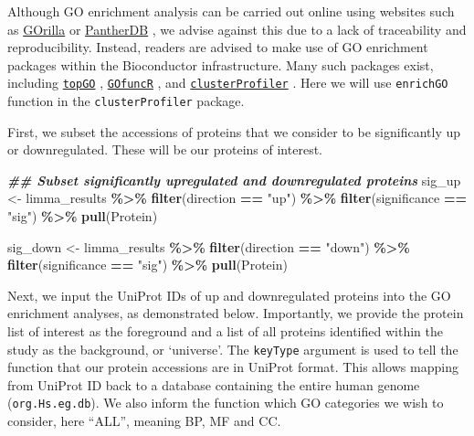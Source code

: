 \documentclass[9pt,a4paper,]{extarticle}
\newenvironment{Shaded}{\begin{snugshade}}{\end{snugshade}}
\newcommand{\DocumentationTok}[1]{\textcolor[rgb]{0.56,0.35,0.01}{\textbf{\textit{#1}}}}
\newcommand{\FunctionTok}[1]{\textcolor[rgb]{0.13,0.29,0.53}{\textbf{#1}}}
\newcommand{\NormalTok}[1]{#1}
\newcommand{\OtherTok}[1]{\textcolor[rgb]{0.56,0.35,0.01}{#1}}
\newcommand{\SpecialCharTok}[1]{\textcolor[rgb]{0.81,0.36,0.00}{\textbf{#1}}}
\newcommand{\StringTok}[1]{\textcolor[rgb]{0.31,0.60,0.02}{#1}}
\begin{document}
Although GO enrichment analysis can be carried out online using websites such
as \href{http://cbl-gorilla.cs.technion.ac.il}{GOrilla} \citep{Eden2009} or
\href{http://www.pantherdb.org}{PantherDB} \citep{Mi2012, Thomas2021}, we advise against
this due to a lack of traceability and reproducibility. Instead, readers are
advised to make use of GO enrichment packages within the Bioconductor
infrastructure. Many such packages exist, including \href{https://bioconductor.org/packages/release/bioc/html/topGO.html}{\texttt{topGO}} \citep{topGO},
\href{https://www.bioconductor.org/packages/release/bioc/html/GOfuncR.html}{\texttt{GOfuncR}} \citep{GofuncR},
and \href{https://bioconductor.org/packages/release/bioc/html/clusterProfiler.html}{\texttt{clusterProfiler}}
\citep{Wu2021}. Here we will use \texttt{enrichGO} function in the \texttt{clusterProfiler} package.

First, we subset the accessions of proteins that we consider to be significantly
up or downregulated. These will be our proteins of interest.

\begin{Shaded}
\begin{Highlighting}[]
\DocumentationTok{\#\# Subset significantly upregulated and downregulated  proteins}
\NormalTok{sig\_up }\OtherTok{\textless{}{-}}\NormalTok{ limma\_results }\SpecialCharTok{\%\textgreater{}\%}
  \FunctionTok{filter}\NormalTok{(direction }\SpecialCharTok{==} \StringTok{"up"}\NormalTok{) }\SpecialCharTok{\%\textgreater{}\%}
  \FunctionTok{filter}\NormalTok{(significance }\SpecialCharTok{==} \StringTok{"sig"}\NormalTok{) }\SpecialCharTok{\%\textgreater{}\%}
  \FunctionTok{pull}\NormalTok{(Protein)}

\NormalTok{sig\_down }\OtherTok{\textless{}{-}}\NormalTok{ limma\_results }\SpecialCharTok{\%\textgreater{}\%}
  \FunctionTok{filter}\NormalTok{(direction }\SpecialCharTok{==} \StringTok{"down"}\NormalTok{) }\SpecialCharTok{\%\textgreater{}\%}
  \FunctionTok{filter}\NormalTok{(significance }\SpecialCharTok{==} \StringTok{"sig"}\NormalTok{) }\SpecialCharTok{\%\textgreater{}\%}
  \FunctionTok{pull}\NormalTok{(Protein)}
\end{Highlighting}
\end{Shaded}

Next, we input the UniProt IDs of up and downregulated proteins into the GO
enrichment analyses, as demonstrated below. Importantly, we provide the protein
list of interest as the foreground and a list of all proteins identified within
the study as the background, or `universe'. The \texttt{keyType} argument is used to
tell the function that our protein accessions are in UniProt format. This allows
mapping from UniProt ID back to a database containing the entire human genome
(\texttt{org.Hs.eg.db}). We also inform the function which GO categories we wish to
consider, here ``ALL'', meaning BP, MF and CC.
\end{document}
